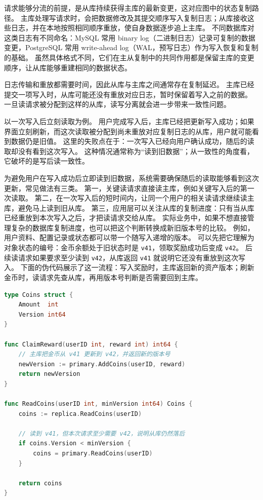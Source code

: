 请求能够分流的前提，是从库持续获得主库的最新变更，这对应图中的状态复制路径。
主库处理写请求时，会把数据修改及其提交顺序写入复制日志；从库接收这些日志，并在本地按照相同顺序重放，使自身数据逐步追上主库。
不同数据库对这类日志有不同命名：MySQL 常用 binary log（二进制日志）记录可复制的数据变更，PostgreSQL 常用 write-ahead log（WAL，预写日志）作为写入恢复和复制的基础。
虽然具体格式不同，它们在主从复制中的共同作用都是保留主库的变更顺序，让从库能够重建相同的数据状态。

日志传输和重放都需要时间，因此从库与主库之间通常存在复制延迟。
主库已经提交一项写入时，从库可能还没有重放对应日志，暂时保留着写入之前的数据。
一旦读请求被分配到这样的从库，读写分离就会进一步带来一致性问题。

以一次写入后立刻读取为例。
用户完成写入后，主库已经把更新写入成功；如果界面立刻刷新，而这次读取被分配到尚未重放对应复制日志的从库，用户就可能看到数据仍是旧值。
这里的失败点在于：一次写入已经向用户确认成功，随后的读取却没有看到这次写入。
这种情况通常称为“读到旧数据”；从一致性的角度看，它破坏的是写后读一致性。

为避免用户在写入成功后立即读到旧数据，系统需要确保随后的读取能够看到这次更新，常见做法有三类。
第一，关键读请求直接读主库，例如关键写入后的第一次读取。
第二，在一次写入后的短时间内，让同一个用户的相关读请求继续读主库，避免马上读到旧从库。
第三，应用层可以关注从库的复制进度：只有当从库已经重放到本次写入之后，才把读请求交给从库。
实际业务中，如果不想直接管理复杂的数据库复制进度，也可以把这个判断转换成新旧版本号的比较。
例如，用户资料、配置记录或状态都可以带一个随写入递增的版本。
可以先把它理解为对象状态的编号：金币余额处于旧状态时是 \texttt{v41}，领取奖励成功后变成 \texttt{v42}。
后续读请求如果要求至少读到 \texttt{v42}，从库返回 \texttt{v41} 就说明它还没有重放到这次写入。
下面的伪代码展示了这一流程：写入奖励时，主库返回新的资产版本；刷新金币时，读请求先查从库，再用版本号判断是否需要回到主库。

\begin{tcolorbox}[title=写入后的版本号读写流程]
\begin{lstlisting}[style=codeblock, language=go]
type Coins struct {
    Amount  int
    Version int64
}

func ClaimReward(userID int, reward int) int64 {
    // 主库把金币从 v41 更新到 v42，并返回新的版本号
    newVersion := primary.AddCoins(userID, reward)
    return newVersion
}

func ReadCoins(userID int, minVersion int64) Coins {
    coins := replica.ReadCoins(userID)

    // 读到 v41，但本次请求至少需要 v42，说明从库仍然落后
    if coins.Version < minVersion {
        coins = primary.ReadCoins(userID)
    }

    return coins
}
\end{lstlisting}
\end{tcolorbox}

